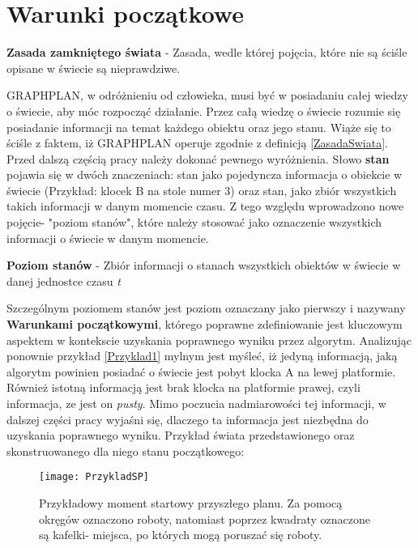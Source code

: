\section{Warunki początkowe}
    \label{RozdzialWarunkiPoczatkowe}
    \begin{definition}
        \label{ZasadaSwiata}
        \textbf{Zasada zamkniętego świata} - Zasada, wedle której pojęcia, które nie są ściśle opisane w świecie są nieprawdziwe.
    \end{definition}
    GRAPHPLAN, w odróżnieniu od człowieka, musi być w posiadaniu całej wiedzy o świecie, aby móc rozpocząć działanie. Przez całą wiedzę o świecie rozumie się
    posiadanie informacji na temat każdego obiektu oraz jego stanu. Wiąże się to ściśle z faktem,
    iż GRAPHPLAN operuje zgodnie z definicją \ref{ZasadaSwiata}. 
    Przed dalszą częścią pracy należy dokonać pewnego wyróżnienia. Słowo \textbf{stan} pojawia się w dwóch znaczeniach:
    stan jako pojedyncza informacja o obiekcie w świecie (Przykład: klocek B na stole numer 3) oraz stan, jako zbiór wszystkich takich informacji w danym momencie czasu.
    Z tego względu wprowadzono nowe pojęcie- "poziom stanów", które należy stosować jako oznaczenie wszystkich informacji o świecie w danym momencie.
    \begin{definition}
        \label{PoziomStanow}
        \textbf{Poziom stanów} - Zbiór informacji o stanach wszystkich obiektów w świecie w danej jednostce czasu \textit{t}
    \end{definition}
    Szczególnym poziomem stanów jest poziom oznaczany jako pierwszy i nazywany \textbf{Warunkami początkowymi}, którego poprawne zdefiniowanie jest kluczowym aspektem w kontekscie
    uzyskania poprawnego wyniku przez algorytm.
    Analizując ponownie przykład \ref{Przyklad1} mylnym jest myśleć, iż jedyną informacją, jaką algorytm powinien posiadać o świecie jest pobyt klocka A na lewej platformie. Również
    istotną informacją jest brak klocka na platformie prawej, czyli informacja, ze jest on \textit{pusty}. Mimo poczucia nadmiarowości tej informacji, w dalszej części pracy wyjaśni
    się, dlaczego ta informacja jest niezbędna do uzyskania poprawnego wyniku.
    Przykład świata przedstawionego oraz skonstruowanego dla niego stanu początkowego:
    \begin{figure}[H]
        \texttt{[image: PrzykladSP]}
        \centering
        \caption{Przykładowy moment startowy przyszłego planu. Za pomocą okręgów oznaczono roboty, natomiast poprzez kwadraty oznaczone są kafelki- miejsca,
        po których mogą poruszać się roboty.}
        \label{PrzykladSP}
    \end{figure}
